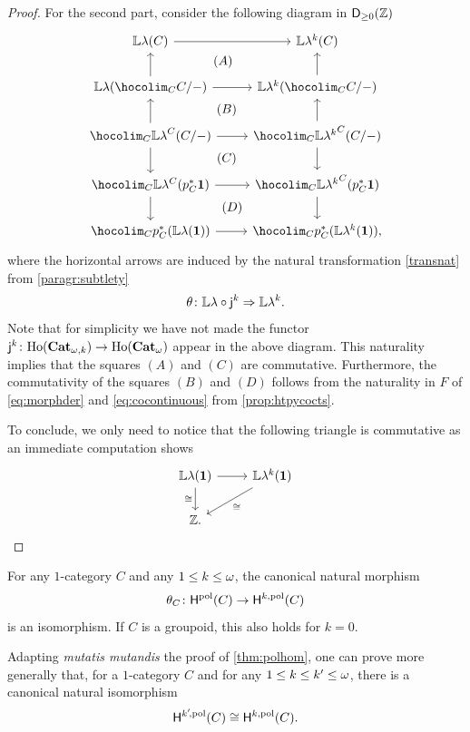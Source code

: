 \begin{proof}
  For the second part, consider the following diagram in $\mathsf{D}_{\geq 0}(\mathbb Z)$
  \[
    \begin{tikzcd}
      \LL\abel(C)\ar[r] & \LL\abelk{k}(C)\\
       \LL\abel(\hocolim_{C}\tr{C}{-})\ar[r]\ar[u]&
       \LL\abelk{k}(\hocolim_{C}\tr{C}{-})\ar[u]\\
       \hocolim_{C}\fun{C}{\LL
     \abel}(\tr{C}{-})\ar[r] \ar[u]\ar[d]& \hocolim_{C}\fun{C}{\LL
     \abelk{k}}(\tr{C}{-})\ar[u]\ar[d]\\
   \hocolim_{C}\LL \fun{C}{\abel}(p_C^*\Term)\ar[r] \ar[d]& \hocolim_{C}\LL
   \fun{C}{\abelk{k}}(p_C^*\Term)\ar[d] \\
    \hocolim_{C}p^*_C(\LL \abel(\Term))\ar[r]& \hocolim_{C}p^*_C(\LL
    \abelk{k}(\Term)),
    \ar[from=1-1,to=2-2,phantom,description, "(A)"]
    \ar[from=2-1,to=3-2,phantom,description,"(B)"]
    \ar[from=3-1,to=4-2,phantom,description,"(C)"]
    \ar[from=4-1,to=5-2,phantom,description,"(D)"]
  \end{tikzcd}
\]
where the horizontal arrows are induced by the natural transformation
\eqref{transnat} from \cref{paragr:subtlety}
\[
    \theta \colon \mathbb{L} \mathsf{\lambda}\circ \mathsf{j}_{}^{k} \Rightarrow \mathbb{L} \mathsf{\mathsf{\lambda}}^{k}.
  \]
  Note that for simplicity we have not made the functor
  $\mathsf{j}_{}^{k} \colon \mathrm{Ho}(\mathbf{Cat}_{\omega,k})\to \mathrm{Ho}(\mathbf{Cat}_{\omega})$ appear in the above
  diagram. This naturality implies that the squares $(A)$ and $(C)$ are
  commutative. Furthermore, the commutativity of the squares $(B)$ and
  $(D)$ follows from the naturality in $F$ of \eqref{eq:morphder} and
  \eqref{eq:cocontinuous} from \cref{prop:htpycocts}.

  To conclude, we only need to notice that the following triangle is
  commutative as an immediate computation shows
  \[
    \begin{tikzcd}
      \LL \abel(\Term) \ar[d,"\cong"']\ar[r] & \LL \abelk{k}(\Term)\ar[dl,"\cong"]\\
      \Z.&
    \end{tikzcd}
  \]
\end{proof}
\begin{corollary}
  For any $1$\nbd-category $C$ and any $1 \leq k \leq \omega$, the
  canonical natural morphism
  \[
   \theta_C \colon \mathsf{H}^{\mathrm{pol}}(C) \to \mathsf{H}^{k,\mathrm{pol}}(C)
  \]
  is an isomorphism. If $C$ is a groupoid, this also holds for $k=0$.
\end{corollary}
\begin{remark}
  Adapting \emph{mutatis mutandis} the proof of
  \cref{thm:polhom}, one can prove more generally that, for a
  $1$-category $C$ and for any $1 \leq k \leq k' \leq \omega$, there is a canonical natural isomorphism
  \[
     \mathsf{H}^{k'\!,\mathrm{pol}}(C)\cong  \mathsf{H}^{k,\mathrm{pol}}(C).
  \]
\end{remark}

